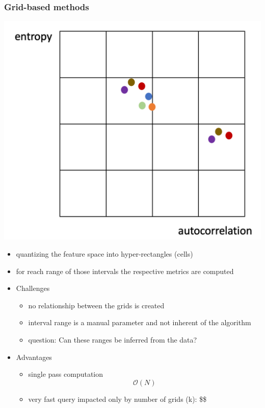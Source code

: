 \documentclass[11pt]{article}
\begin{document}
\subsubsection*{Grid-based methods}
\label{sec:org47325a7}
\begin{center}
\includegraphics[width=.9\linewidth]{./img/grid_based.png}
\end{center}
\begin{itemize}
\item quantizing the feature space into hyper-rectangles (cells)
\item for reach range of those intervals the respective metrics are computed
\end{itemize}
\begin{itemize}
\item Challenges
\label{sec:orgeda1bf8}
\begin{itemize}
\item no relationship between the grids is created
\item interval range is a manual parameter and not inherent of the algorithm
\item question: Can these ranges be inferred from the data?
\end{itemize}
\item Advantages
\label{sec:orgf446c72}
\begin{itemize}
\item single pass computation $$ \mathcal{O}(N) $$
\item very fast query impacted only by number of grids (k): \$\$ \mathcal
\end{itemize}
\end{itemize}
\end{document}
